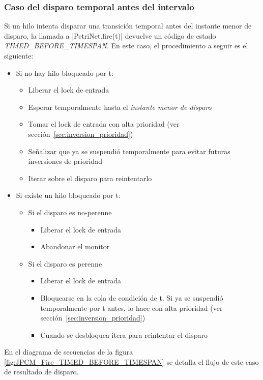 \subsubsection*{Caso del disparo temporal antes del intervalo}
Si un hilo intenta disparar una transición temporal antes del instante menor de
disparo, la llamada a |PetriNet.fire(t)| devuelve un código de estado
\textit{TIMED\_BEFORE\_TIMESPAN}.
En este caso, el procedimiento a seguir es el siguiente:
\begin{itemize}
  \item Si no hay hilo bloqueado por t:
      \begin{itemize}
        \item Liberar el lock de entrada
        \item Esperar temporalmente hasta el \textit{instante menor de disparo}
        \item Tomar el lock de entrada con alta prioridad (ver
        sección~\ref{sec:inversion_prioridad})
        \item Señalizar que ya se suspendió temporalmente para evitar futuras
        inversiones de prioridad
        \item Iterar sobre el disparo para reintentarlo
      \end{itemize}
  \item Si existe un hilo bloqueado por t:
      \begin{itemize}
        \item Si el disparo es no-perenne
                \begin{itemize}
                  \item Liberar el lock de entrada
                  \item Abandonar el monitor
                \end{itemize}
        \item Si el disparo es perenne
                \begin{itemize}
                  \item Liberar el lock de entrada
                  \item Bloquearse en la cola de condición de t. Si ya se suspendió
                  temporalmente por t antes, lo hace con alta prioridad (ver
                  sección~\ref{sec:inversion_prioridad})
                  \item Cuando se desbloquea itera para reintentar el disparo
                \end{itemize}
      \end{itemize}
\end{itemize}
En el diagrama de secuencias de la figura
\ref{fig:JPCM_Fire_TIMED_BEFORE_TIMESPAN} se detalla el flujo de este caso de
resultado de disparo.

